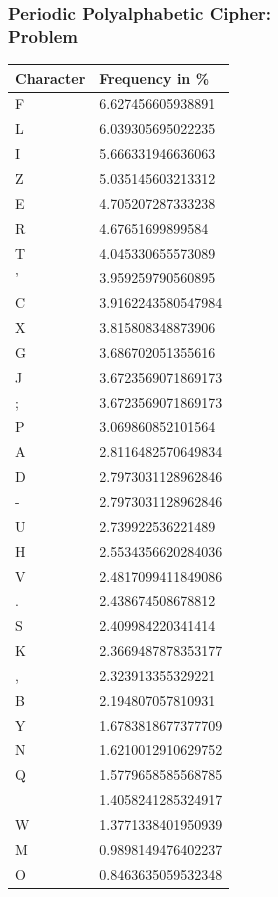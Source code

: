 \documentclass{uva-inf-presentation}
\begin{document}
\begin{frame}
\frametitle{Periodic Polyalphabetic Cipher:\\ Problem}
\begin{minipage}{\linewidth}
\centering
{\fontsize{3.5pt}{4.5pt}\selectfont
\begin{tabular}{ll}\toprule
Character & Frequency in \%     \\
\midrule
F & 6.627456605938891  \\
L & 6.039305695022235  \\
I & 5.666331946636063  \\
Z & 5.035145603213312  \\
E & 4.705207287333238  \\
R & 4.67651699899584   \\
T & 4.045330655573089  \\
' & 3.959259790560895  \\
C & 3.9162243580547984 \\
X & 3.815808348873906  \\
G & 3.686702051355616  \\
J & 3.6723569071869173 \\
; & 3.6723569071869173 \\
P & 3.069860852101564  \\
A & 2.8116482570649834 \\
D & 2.7973031128962846 \\
- & 2.7973031128962846 \\
U & 2.739922536221489  \\
H & 2.5534356620284036 \\
V & 2.4817099411849086 \\
. & 2.438674508678812  \\
S & 2.409984220341414  \\
K & 2.3669487878353177 \\
, & 2.323913355329221  \\
B & 2.194807057810931  \\
Y & 1.6783818677377709 \\
N & 1.6210012910629752 \\
Q & 1.5779658585568785 \\
  & 1.4058241285324917 \\
W & 1.3771338401950939 \\
M & 0.9898149476402237 \\
O & 0.8463635059532348 \\ \bottomrule
\end{tabular}}
\end{minipage}%
\end{frame}
\end{document}
